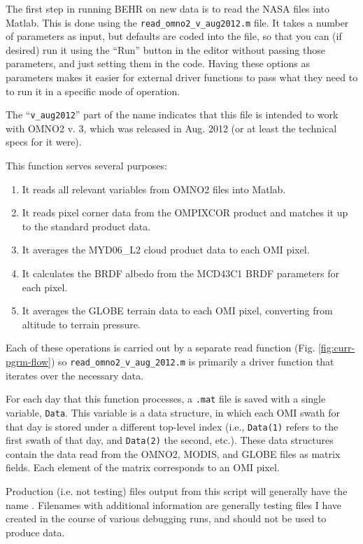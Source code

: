 \documentclass[12pt]{article}
\begin{document}
	The first step in running BEHR on new data is to read the NASA files into Matlab.  This is done using the \texttt{read\_omno2\_v\_aug2012.m} file.  It takes a number of parameters as input, but defaults are coded into the file, so that you can (if desired) run it using the ``Run'' button in the editor without passing those parameters, and just setting them in the code. Having these options as parameters makes it easier for external driver functions to pass what they need to to run it in a specific mode of operation.
	
	 The ``\texttt{v\_aug2012}'' part of the name indicates that this file is intended to work with OMNO2 v. 3, which was released in Aug. 2012 (or at least the technical specs for it were).  
	 
	 This function serves several purposes: 
		\begin{enumerate}
 		 \item It reads all relevant variables from OMNO2 files into Matlab.
 		 \item It reads pixel corner data from the OMPIXCOR product and matches it up to the standard product data.
		 \item It averages the MYD06\_L2 cloud product data to each OMI pixel.
		 \item It calculates the BRDF albedo from the MCD43C1 BRDF parameters for each pixel.
		 \item It averages the GLOBE terrain data to each OMI pixel, converting from altitude to terrain pressure.
		\end{enumerate}
Each of these operations is carried out by a separate read function (Fig. \ref{fig:curr-pgrm-flow}) so \lstinline$read_omno2_v_aug_2012.m$ is primarily a driver function that iterates over the necessary data.		
		
	For each day that this function processes, a \texttt{.mat} file is saved with a single variable, \texttt{Data}.  This variable is a data structure, in which each OMI swath for that day is stored under a different top-level index (i.e., \texttt{Data(1)} refers to the first swath of that day, and \texttt{Data(2)} the second, etc.).  These data structures contain the data read from the OMNO2, MODIS, and GLOBE files as matrix fields.  Each element of the matrix corresponds to an OMI pixel.
	
	Production (i.e. not testing) files output from this script will generally have the name .  Filenames with additional information are generally testing files I have created in the course of various debugging runs, and should not be used to produce  data.
	
\end{document}
